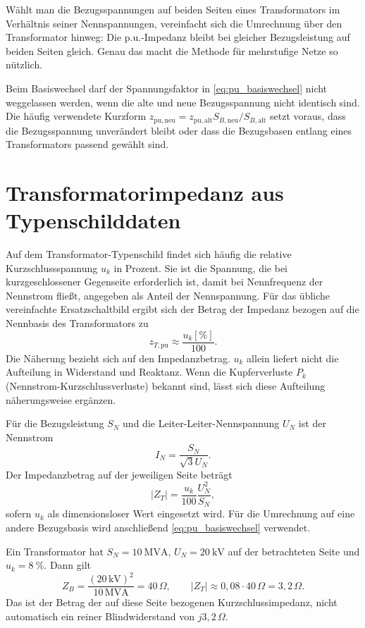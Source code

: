 Wählt man die Bezugsspannungen auf beiden Seiten eines Transformators im
Verhältnis seiner Nennspannungen, vereinfacht sich die Umrechnung über den
Transformator hinweg: Die p.u.-Impedanz bleibt bei gleicher Bezugsleistung
auf beiden Seiten gleich. Genau das macht die Methode für mehrstufige Netze
so nützlich.

\begin{merke}
Beim Basiswechsel darf der Spannungsfaktor in
\cref{eq:pu_basiswechsel} nicht weggelassen werden, wenn die alte und neue
Bezugsspannung nicht identisch sind. Die häufig verwendete Kurzform
$z_{\mathrm{pu,neu}}=z_{\mathrm{pu,alt}}S_{B,\mathrm{neu}}/S_{B,\mathrm{alt}}$
setzt voraus, dass die Bezugsspannung unverändert bleibt oder dass die
Bezugsbasen entlang eines Transformators passend gewählt sind.
\end{merke}

\section{Transformatorimpedanz aus Typenschilddaten}

Auf dem Transformator-Typenschild findet sich häufig die relative
Kurzschlussspannung $u_k$ in Prozent. Sie ist die Spannung, die bei
kurzgeschlossener Gegenseite erforderlich ist, damit bei Nennfrequenz der
Nennstrom fließt, angegeben als Anteil der Nennspannung. Für das übliche
vereinfachte Ersatzschaltbild ergibt sich der Betrag der Impedanz bezogen auf
die Nennbasis des Transformators zu
\begin{equation}
  z_{T,\mathrm{pu}}\approx\frac{u_k[\%]}{100}.
  \label{eq:uk_pu}
\end{equation}
Die Näherung bezieht sich auf den Impedanzbetrag. $u_k$ allein liefert nicht
die Aufteilung in Widerstand und Reaktanz. Wenn die Kupferverluste $P_k$
(Nennstrom-Kurzschlussverluste) bekannt sind, lässt sich diese Aufteilung
näherungsweise ergänzen.

Für die Bezugsleistung $S_N$ und die Leiter-Leiter-Nennspannung $U_N$ ist der
Nennstrom
\[
 I_N=\frac{S_N}{\sqrt{3}U_N}.
\]
Der Impedanzbetrag auf der jeweiligen Seite beträgt
\begin{equation}
 |Z_T|=\frac{u_k}{100}\frac{U_N^2}{S_N},
 \label{eq:zt_ohm}
\end{equation}
sofern $u_k$ als dimensionsloser Wert eingesetzt wird. Für die Umrechnung auf
eine andere Bezugsbasis wird anschließend
\cref{eq:pu_basiswechsel} verwendet.

\begin{rechenbeispiel}
Ein Transformator hat $S_N=\SI{10}{\mega\volt\ampere}$,
$U_N=\SI{20}{\kilo\volt}$ auf der betrachteten Seite und $u_k=\SI{8}{\percent}$.
Dann gilt
\[
 Z_B=\frac{(20\,\mathrm{kV})^2}{10\,\mathrm{MVA}}=40\,\Omega,
 \qquad |Z_T|\approx0{,}08\cdot40\,\Omega=3{,}2\,\Omega.
\]
Das ist der Betrag der auf diese Seite bezogenen Kurzschlussimpedanz, nicht
automatisch ein reiner Blindwiderstand von $j3{,}2\,\Omega$.
\end{rechenbeispiel}

